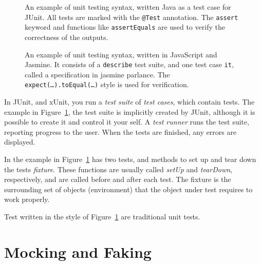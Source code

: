 \documentclass[a4paper,11pt]{kth-mag}
\theoremstyle{definition}
\begin{document}
\begin{figure}[h!]
	\begin{center}
	\begin{minipage}{0.9\textwidth}
		\lstset{language=Java}
		
	\end{minipage}
	\end{center}
  \caption{An example of unit testing syntax, written Java as a test case for
    JUnit. All tests are marked with the \texttt{@Test} annotation. The
    \texttt{assert} keyword and functions like \texttt{assertEquals} are used
    to verify the correctness of the outputs.}
	\label{figure-junit}
\end{figure}

\begin{figure}[h!]
	\begin{center}
	\begin{minipage}{0.9\textwidth}
		\lstset{language=JavaScript}
		
	\end{minipage}
	\end{center}
  \caption{An example of unit testing syntax, written in JavaScript and
    Jasmine. It consists of a \texttt{describe} test suite, and one test case
    \texttt{it}, called a specification in jasmine parlance. The
    \texttt{expect(\dots).toEqual(\dots)} style is used for verification.}
	\label{figure-jasmine}
\end{figure}

In JUnit, and xUnit, you run a \textit{test suite} of \textit{test cases},
which contain tests. The example in Figure~\ref{figure-junit}, the test suite
is implicitly created by JUnit, although it is possible to create it and
control it your self. A \textit{test runner} runs the test suite, reporting
progress to the user. When the tests are finished, any errors are displayed.

In the example in Figure~\ref{figure-junit} has two tests, and methods to set
up and tear down the tests \textit{fixture}. These functions are usually called
\textit{setUp} and \textit{tearDown}, respectively, and are called before and
after each test. The fixture is the surrounding set of objects (environment)
that the object under test requires to work properly.

Test written in the style of Figure~\ref{figure-junit} are traditional unit
tests.


\section{Mocking and Faking} \label{section-mocking}
\end{document}
